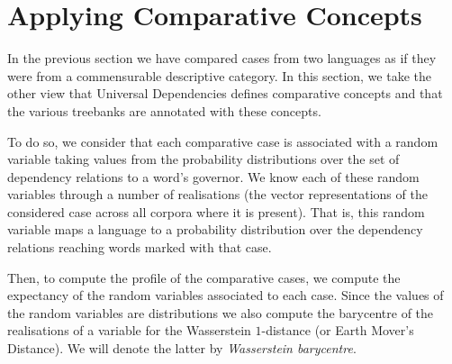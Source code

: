 \section{Applying Comparative Concepts}

In the previous section we have compared cases from two languages as if they were from a commensurable descriptive category.
In this section, we take the other view that Universal Dependencies defines comparative concepts and that the various treebanks are annotated with these concepts.



To do so, we consider that each comparative case is associated with a random variable taking values from the probability distributions over the set of dependency relations to a word's governor. 
We know each of these random variables through a number of realisations (the vector representations of the considered case across all corpora where it is present). 
That is, this random variable maps a language to a probability distribution over the dependency relations reaching words marked with that case. 

Then, to compute the profile of the comparative cases, we compute the expectancy of the random variables associated to each case. 
Since the values of the random variables are distributions we also compute the barycentre of the realisations of a variable for the Wasserstein $1$-distance (or Earth Mover's Distance). 
We will denote the latter by \emph{Wasserstein barycentre}.

